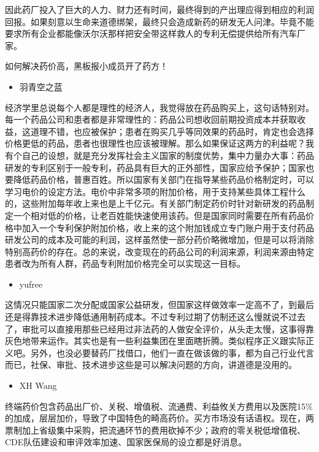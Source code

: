 \documentclass[]{book}
\providecommand{\tightlist}{%
  \setlength{\itemsep}{0pt}\setlength{\parskip}{0pt}}
\begin{document}
因此药厂投入了巨大的人力、财力还有时间，最终得到的产出理应得到相应的利润回报。如果刻意以生命来道德绑架，最终只会造成新药的研发无人问津。毕竟不能要求所有企业都能像沃尔沃那样把安全带这样救人的专利无偿提供给所有汽车厂家。

如何解决药价高，黑板报小成员开了药方！

\begin{itemize}
\tightlist
\item
  羽青空之蓝
\end{itemize}

经济学里总说每个人都是理性的经济人，我觉得放在药品购买上，这句话特别对。每一个药品公司和患者都是非常理性的：药品公司想收回前期投资成本并获取收益，这道理不错，也应被保护；患者在购买几乎等同效果的药品时，肯定也会选择价格更低的药品，患者也很理性也应该被理解。那么如果保证这两方的利益呢？我有个自己的设想，就是充分发挥社会主义国家的制度优势，集中力量办大事：药品研发的专利区别于一般专利，药品具有巨大的正外部性，国家应给予保护；国家也要降低药品价格，普惠百姓。所以国家有关部门在指导某些药品价格制定时，可以学习电价的设定方法。电价中非常多项的附加价格，用于支持某些具体工程什么的，这些附加每年收上来也是上千亿元。有关部门制定药价时针对新研发的药品制定一个相对低的价格，让老百姓能快速使用该药。但是国家同时需要在所有药品价格中加入一个专利保护附加价格，收上来的这个附加钱成立专门账户用于支付药品研发公司的成本及可能的利润，这样虽然使一部分药价略微增加，但是可以将消除特别高药价的存在。总的来说，改变现在的药品公司的利润来源，利润来源由特定患者改为所有人群，药品专利附加价格完全可以实现这一目标。

\begin{itemize}
\tightlist
\item
  yufree
\end{itemize}

这情况只能国家二次分配或国家公益研发，但国家这样做效率一定高不了，到最后还是得靠技术进步降低通用制药成本。不过专利过期了仿制还这么慢就说不过去了，审批可以直接用那些已经用过非法药的人做安全评价，从头走太慢，这事得靠灰色地带来运作。其实也是有一些利益集团在里面瞎折腾。类似程序正义跟实际正义吧。另外，也没必要替药厂找借口，他们一直在做该做的事，都为自己行业代言而已，社保、审批、技术进步这些是可以解决问题的方向，讲道德是没用的。

\begin{itemize}
\tightlist
\item
  XH Wang
\end{itemize}

终端药价包含药品出厂价、关税、增值税、流通费、利益攸关方费用以及医院15\%的加成，层层加价，导致了中国特色的畸高药价。买方市场没有话语权。现在，两票制加上省级集中采购，把流通环节的费用砍掉不少；政府的零关税低增值税、CDE队伍建设和审评效率加速、国家医保局的设立都是好消息。
\end{document}
